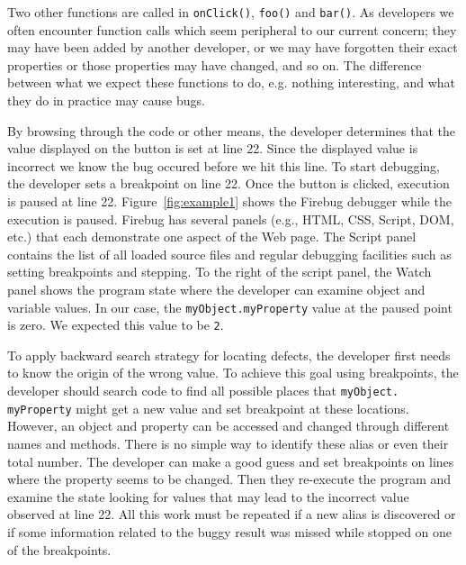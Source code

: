 \documentclass[runningheads,a4paper]{llncs}
\begin{document}
Two other functions are called in \texttt{onClick()}, \texttt{foo()}
and \texttt{bar()}. As developers we often encounter function calls
which seem peripheral to our current concern; they may have been added
by another developer, or we may have forgotten their exact properties
or those properties may have changed, and so on. The difference
between what we expect these functions to do, e.g. nothing
interesting, and what they do in practice may cause bugs.


By browsing through the code or other means\cite{Barton2010},
 the developer determines that the value displayed on the 
button is set at line 22. Since the displayed value is incorrect we know 
the bug occured before we hit this line.
To start debugging, the developer sets a breakpoint
on line 22. Once the button is clicked, execution is paused at line
22. Figure~\ref{fig:example1} shows the Firebug debugger while the
execution is paused. Firebug has several panels (e.g., HTML, CSS,
Script, DOM, etc.) that each demonstrate one aspect of the Web page.
The Script panel contains the list of all loaded source
files and regular debugging facilities such as setting breakpoints and
stepping. To the right of the script panel, the Watch panel shows the program state
where the developer can examine object and variable values. In our case, the
\texttt{myObject.myProperty} value at the paused point is zero. We expected this value to be \texttt{2}.

To apply backward search strategy for locating defects, the developer
first needs to know the origin of the wrong value. To achieve this
goal using breakpoints, the developer should search code to find all possible places that
\texttt{myObject. myProperty} might get a new value and set breakpoint at these locations. However, an
object and property can be accessed and changed through different
names and methods. There is no simple way to identify these alias or
even their total number.  The developer can make a good guess and set
breakpoints on lines where the property seems to be changed. Then they
re-execute the program and examine the state looking for values that
may lead to the incorrect value observed at line 22. All this work
must be repeated if a new alias is discovered or if some
information related to the buggy result was missed while stopped on
one of the breakpoints.
\end{document}
